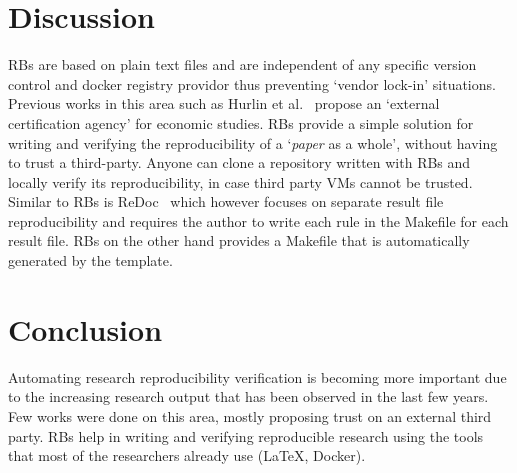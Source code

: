 \documentclass[journal]{IEEEtran}
\begin{document}
\section{Discussion}
RBs are based on plain text files and are independent of any specific version control and docker registry providor thus preventing `vendor lock-in' situations.
Previous works in this area such as Hurlin et al.~\cite{hurlin2019reproducibility} propose an `external certification agency' for economic studies.
RBs provide a simple solution for writing and verifying the reproducibility of a `\textit{paper} as a whole', without having to trust a third-party.
Anyone can clone a repository written with RBs and locally verify its reproducibility, in case third party VMs cannot be trusted.
Similar to RBs is ReDoc~\cite{schwab2000making} which however focuses on separate result file reproducibility and requires the author to write each rule in the Makefile for each result file.
RBs on the other hand provides a Makefile that is automatically generated by the template.

\section{Conclusion}
Automating research reproducibility verification is becoming more important due to the increasing research output that has been observed in the last few years.
Few works were done on this area, mostly proposing trust on an external third party.
RBs help in writing and verifying reproducible research using the tools that most of the researchers already use (\LaTeX, Docker).



\end{document}
